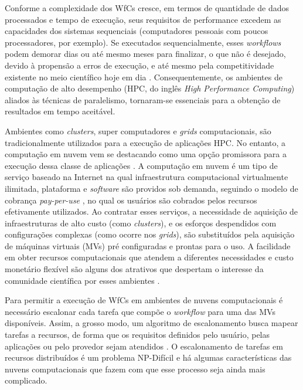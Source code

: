 Conforme a complexidade dos WfCs cresce, em termos de quantidade de dados processados e tempo de execução, seus requisitos de performance excedem as capacidades dos sistemas sequenciais (computadores pessoais com poucos processadores, por exemplo). Se executados sequencialmente, esses \textit{workflows} podem demorar dias ou até mesmo meses para finalizar, o que não é desejado, devido à propensão a erros de execução, e até mesmo pela competitividade existente no meio científico hoje em dia \cite{Fang2015}. Consequentemente, os ambientes de computação de alto desempenho (HPC, do inglês \textit{High Performance Computing}) aliados às técnicas de paralelismo, tornaram-se essenciais para a obtenção de resultados em tempo aceitável.

Ambientes como \textit{clusters}, super computadores e \textit{grids} computacionais, são tradicionalmente utilizados para a execução de aplicações HPC. No entanto, a computação em nuvem \cite{vaquero2008} vem se destacando como uma opção promissora para a execução dessa classe de aplicações \cite{Liu2015}. A computação em nuvem é um tipo de serviço baseado na Internet na qual infraestrutura computacional virtualmente ilimitada, plataforma e \textit{software} são providos sob demanda, seguindo o modelo de cobrança \textit{pay-per-use} \cite{Youseff08, oliveira2010b}, no qual os usuários são cobrados pelos recursos efetivamente utilizados. Ao contratar esses serviços, a necessidade de aquisição de infraestruturas de alto custo (como \textit{clusters}), e os esforços despendidos com configurações complexas (como ocorre nos \textit{grids}), são substituídos pela aquisição de máquinas virtuais (MVs) pré configuradas e prontas para o uso.  A facilidade em obter recursos computacionais que atendem a diferentes necessidades e custo monetário flexível são alguns dos atrativos que despertam o interesse da comunidade científica por esses ambientes \cite{oliveira2010a}. 

Para permitir a execução de WfCs em ambientes de nuvens computacionais é necessário escalonar cada tarefa  que compõe o \textit{workflow} para uma das MVs disponíveis. Assim, a grosso modo, um algoritmo de escalonamento busca mapear tarefas a recursos, de forma que os requisitos definidos pelo usuário, pelas aplicações ou pelo provedor sejam atendidos \cite{minmin}. O escalonamento de tarefas em recursos distribuídos é um problema NP-Difícil \cite{Ullman1973} e há algumas características das nuvens computacionais que fazem com que esse processo seja ainda mais complicado.

